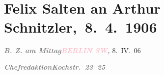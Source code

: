 

\renewcommand{\erwaehntePersonen}{Personen: Herbert Ginsberg, Ottilie Salten, Olga Schnitzler}
\renewcommand{\erwaehnteInstitutionen}{Institutionen: B.Z. am Mittag}
\renewcommand{\erwaehnteOrte}{Orte: Berlin, Griechenland, Kairo, Kochstraße, Wien}
\renewcommand{\erwaehnteWerke}{Werke: Reisen der Jahre 1893–1909}
\section[ Felix Salten an Arthur Schnitzler, 8. 4. 1906]{Felix Salten an Arthur Schnitzler, 8. 4. 1906}
\nopagebreak{}
\rehead{ }\normalsize\beginnumbering{}
\toendnotes[C]{\smallbreak\pagebreak[2]}
\toendnotes[C]{\smallbreak}
\pstart
           \noindent{}{\pb}\textcolor{brown}{\textcolor{gray}{\textbf{\emph{B. Z. am Mittag}}}}{}\ledrightnote{\textcolor{brown}{B.Z. am Mittag}}\hfill \textcolor{gray}{\textbf{\emph{\textcolor{pink}{BERLIN SW}{}\ledrightnote{\textcolor{pink}{Berlin}},}}}{ }8. IV. 06\pend
           
\pstart
           \textcolor{gray}{\textbf{\emph{Chefredaktion}}}\hfill \textcolor{pink}{\textcolor{gray}{\textbf{\emph{Kochstr. 23–25}}}}{}\ledrightnote{\textcolor{pink}{Kochstraße}}\pend
           
